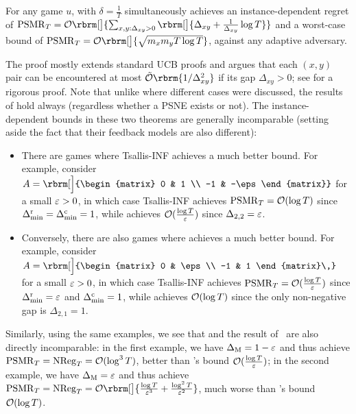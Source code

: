 \begin{theorem}\label{thm:pureucb}
    For any game $u$, \PureUCB{} with $\delta=\frac{1}{T}$ simultaneously achieves an instance-dependent regret of $\psmr_T=\order\rbrm[\big]{\sum_{x, y : \Delta_{xy} > 0} \rbrm[\big]{\Delta_{xy}+\frac{1}{\Delta_{xy}}\log T}}$ and a worst-case bound of $\psmr_T=\order\rbrm[\big]{\sqrt{m_x m_y T \log T}}$, against any adaptive adversary.
\end{theorem}

The proof mostly extends standard UCB proofs and argues that each $(x,y)$ pair can be encountered at most  $\tilde{\order}\rbrm{1/\Delta_{xy}^2}$ if its gap $\Delta_{xy}>0$; see  for a rigorous proof.
Note that unlike  where different cases were discussed, the results of  hold always (regardless whether a PSNE exists or not).
The instance-dependent bounds in these two theorems are generally incomparable (setting aside the fact that their feedback models are also different):
\begin{itemize}[itemsep=2pt,topsep=2pt]
    \item There are games where Tsallis-INF achieves a much better bound. For example, consider $A=\rbrm[\Big]{\begin{matrix}
        0 & 1 \\ 
        -1 & -\eps
        \end{matrix}}$ for a small $\varepsilon > 0$,
        in which case Tsallis-INF achieves $\mathrm{PSMR}_T=\mathcal{O}(\log T)$ since $\Delta^{\mathrm{r}}_{\mathrm{min}}=\Delta^{\mathrm{c}}_{\mathrm{min}}=1$, 
        while \PureUCB{} achieves $\mathcal{O}(\frac{\log T}{\varepsilon})$ since $\Delta_{2,2} = \varepsilon$.
     
     \item Conversely, there are also games where \PureUCB{} achieves a much better bound. For example, consider $A=\rbrm[\Big]{\begin{matrix}
    0 & \eps \\ 
    -1 & 1
    \end{matrix}\,}$ for a small $\varepsilon > 0$,
    in which case Tsallis-INF achieves $\mathrm{PSMR}_T=\mathcal{O}(\frac{\log T}{\varepsilon})$ since $\Delta^{\mathrm{r}}_{\mathrm{min}}=\varepsilon$ and $\Delta^{\mathrm{c}}_{\mathrm{min}}=1$, 
    while \PureUCB{} achieves $\mathcal{O}(\log T)$ since the only non-negative gap is $\Delta_{2,1} = 1$.
\end{itemize}

Similarly, using the same examples, we see that  and the result of~\citet{maiti2025limitations} are also directly incomparable:
in the first example, we have $\Delta_{\mathrm{M}}=1-\varepsilon$ and thus \citet{maiti2025limitations} achieve $\mathrm{PSMR}_T=\mathrm{NReg}_T=\mathcal{O}(\log^3 T)$, better than \PureUCB{}'s bound $\mathcal{O}(\frac{\log T}{\varepsilon})$;
in the second example, we have $\Delta_{\mathrm{M}}=\varepsilon$ and thus \citet{maiti2025limitations} achieve $\psmr_T=\NR_T=\order\rbrm[\big]{\frac{\log T}{\eps^3}+\frac{\log^2 T}{\eps^2}}$, much worse than \PureUCB's bound $\mathcal{O}(\log T)$. %

 



